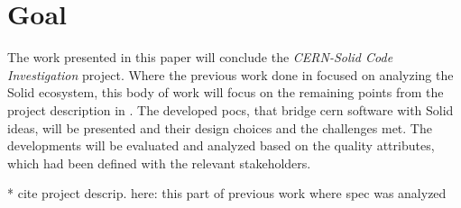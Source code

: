 \section{Goal}

The work presented in this paper will conclude the \textit{\gls{CERN}-Solid Code Investigation} project. Where the previous work done in \cite{cern-solid-investigation-spec} focused on analyzing the Solid ecosystem, this body of work will focus on the remaining points from the project description in \cite{cern-solid-code-investigation-project-description}. The developed \glspl{poc}, that bridge \gls{cern} software with Solid ideas, will be presented and their design choices and the challenges met. The developments will be evaluated and analyzed based on the quality attributes, which had been defined with the relevant stakeholders.


* cite project descrip. here: this part of previous work where spec was analyzed